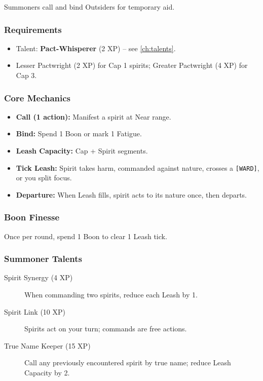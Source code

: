 Summoners call and bind Outsiders for temporary aid.

\subsubsection*{Requirements}
\begin{itemize}
  \item Talent: \textbf{Pact-Whisperer} (2 XP) – see \ref{ch:talents}.
  \item Lesser Pactwright (2 XP) for Cap 1 spirits; Greater Pactwright (4 XP) for Cap 3.
\end{itemize}

\subsubsection*{Core Mechanics}
\label{sec:summoning-mechanics}
\begin{itemize}
  \item \textbf{Call (1 action):} Manifest a spirit at Near range.
  \item \textbf{Bind:} Spend 1 Boon or mark 1 Fatigue.
  \item \textbf{Leash Capacity:} Cap + Spirit segments.
  \item \textbf{Tick Leash:} Spirit takes harm, commanded against nature, crosses a \texttt{[WARD]}, or you split focus.
  \item \textbf{Departure:} When Leash fills, spirit acts to its nature once, then departs.
\end{itemize}

\subsubsection*{Boon Finesse}
\label{sec:boon-finesse}
Once per round, spend 1 Boon to clear 1 Leash tick.

\subsubsection*{Summoner Talents}
\label{sec:summoner-talents}
\begin{description}
  \item[Spirit Synergy (4 XP)] When commanding two spirits, reduce each Leash by 1.
  \item[Spirit Link (10 XP)] Spirits act on your turn; commands are free actions.
  \item[True Name Keeper (15 XP)] Call any previously encountered spirit by true name; reduce Leash Capacity by 2.
\end{description}

